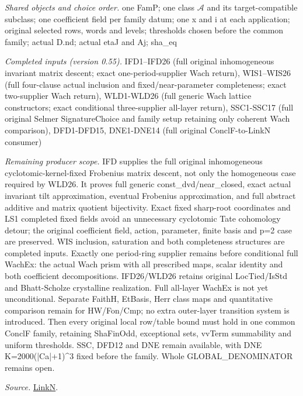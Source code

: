 \documentclass[11pt,a4paper]{article}
\numberwithin{equation}{section}
\theoremstyle{remark}\newtheorem{remark}[theorem]{Remark}
\begin{document}
\emph{Shared objects and choice order.} one FamP; one class $\mathcal A$ and its target-compatible subclass; one coefficient field per family datum; one x and i at each application; original selected rows, words and levels; thresholds chosen before the common family; actual D.nd; actual etaJ and Aj; sha\_\allowbreak eq

\emph{Completed inputs (version 0.55).} IFD1–IFD26 (full original inhomogeneous invariant matrix descent; exact one-period-supplier Wach return), WIS1–WIS26 (full four-clause actual inclusion and fixed/near-parameter completeness; exact two-supplier Wach return), WLD1-WLD26 (full generic Wach lattice constructors; exact conditional three-supplier all-layer return), SSC1-SSC17 (full original Selmer SignatureChoice and family setup retaining only coherent Wach comparison), DFD1-DFD15, DNE1-DNE14 (full original ConclF-to-LinkN consumer)

\emph{Remaining producer scope.} IFD supplies the full original inhomogeneous cyclotomic-kernel-fixed Frobenius matrix descent, not only the homogeneous case required by WLD26. It proves full generic const\_\allowbreak dvd/near\_\allowbreak closed, exact actual invariant tilt approximation, eventual Frobenius approximation, and full abstract additive and matrix quotient bijectivity. Exact fixed sharp-root coordinates and LS1 completed fixed fields avoid an unnecessary cyclotomic Tate cohomology detour; the original coefficient field, action, parameter, finite basis and p=2 case are preserved. WIS inclusion, saturation and both completeness structures are completed inputs. Exactly one period-ring supplier remains before conditional full WachEx: the actual Wach prism with all prescribed maps, scalar identity and both coefficient decompositions. IFD26/WLD26 retains original LocTied/IsStd and Bhatt-Scholze crystalline realization. Full all-layer WachEx is not yet unconditional. Separate FaithH, EtBasis, Herr class maps and quantitative comparison remain for HW/Fon/Cmp; no extra outer-layer transition system is introduced. Then every original local row/table bound must hold in one common ConclF family, retaining ShaFinOdd, exceptional sets, vvTerm summability and uniform thresholds. SSC, DFD12 and DNE remain available, with DNE K=2000(|Ca|+1)\textasciicircum{}3 fixed before the family. Whole GLOBAL\_\allowbreak DENOMINATOR remains open.

\emph{Source.} \href{https://github.com/CocoSgt/riemann-hypothesis-lean/blob/7cbf7a0c32fca1badf05931879a37c3f8a2b03b4/src/Formalism/SharpRestriction/GlobalTheoremInputs.lean#L45-L48}{LinkN}.
\end{document}
